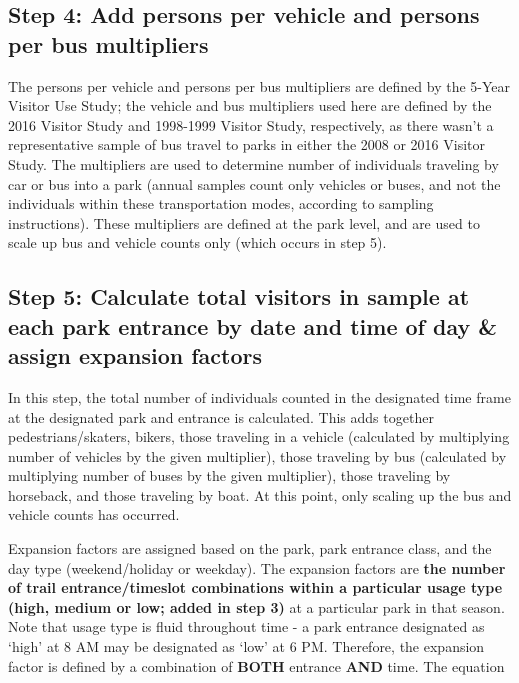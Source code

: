 \documentclass[]{article}
\begin{document}
\subsection{Step 4: Add persons per vehicle and persons per bus
multipliers}\label{step-4-add-persons-per-vehicle-and-persons-per-bus-multipliers}

The persons per vehicle and persons per bus multipliers are defined by
the 5-Year Visitor Use Study; the vehicle and bus multipliers used here
are defined by the 2016 Visitor Study and 1998-1999 Visitor Study,
respectively, as there wasn't a representative sample of bus travel to
parks in either the 2008 or 2016 Visitor Study. The multipliers are used
to determine number of individuals traveling by car or bus into a park
(annual samples count only vehicles or buses, and not the individuals
within these transportation modes, according to sampling instructions).
These multipliers are defined at the park level, and are used to scale
up bus and vehicle counts only (which occurs in step 5).

\subsection{Step 5: Calculate total visitors in sample at each park
entrance by date and time of day \& assign expansion
factors}\label{step-5-calculate-total-visitors-in-sample-at-each-park-entrance-by-date-and-time-of-day-assign-expansion-factors}

In this step, the total number of individuals counted in the designated
time frame at the designated park and entrance is calculated. This adds
together pedestrians/skaters, bikers, those traveling in a vehicle
(calculated by multiplying number of vehicles by the given multiplier),
those traveling by bus (calculated by multiplying number of buses by the
given multiplier), those traveling by horseback, and those traveling by
boat. At this point, only scaling up the bus and vehicle counts has
occurred.

Expansion factors are assigned based on the park, park entrance class,
and the day type (weekend/holiday or weekday). The expansion factors are
\textbf{the number of trail entrance/timeslot combinations within a
particular usage type (high, medium or low; added in step 3)} at a
particular park in that season. Note that usage type is fluid throughout
time - a park entrance designated as `high' at 8 AM may be designated as
`low' at 6 PM. Therefore, the expansion factor is defined by a
combination of \textbf{BOTH} entrance \textbf{AND} time. The equation
\end{document}
